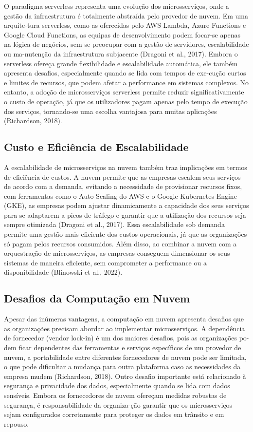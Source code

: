 O paradigma serverless representa uma evolução dos microsserviços, onde a gestão da infraestrutura é totalmente abstraída pelo provedor de nuvem. Em uma arquite-tura serverless, como as oferecidas pelo AWS Lambda, Azure Functions e Google Cloud Functions, as equipas de desenvolvimento podem focar-se apenas na lógica de negócios, sem se preocupar com a gestão de servidores, escalabilidade ou ma-nutenção da infraestrutura subjacente (Dragoni et al., 2017).
Embora o serverless ofereça grande flexibilidade e escalabilidade automática, ele também apresenta desafios, especialmente quando se lida com tempos de exe-cução curtos e limites de recursos, que podem afetar a performance em sistemas complexos. No entanto, a adoção de microsserviços serverless permite reduzir significativamente o custo de operação, já que os utilizadores pagam apenas pelo tempo de execução dos serviços, tornando-se uma escolha vantajosa para muitas aplicações (Richardson, 2018).

\subsection{Custo e Eficiência de Escalabilidade}

A escalabilidade de microsserviços na nuvem também traz implicações em termos de eficiência de custos. A nuvem permite que as empresas escalem seus serviços de acordo com a demanda, evitando a necessidade de provisionar recursos fixos, com ferramentas como o Auto Scaling do AWS e o Google Kubernetes Engine (GKE), as empresas podem ajustar dinamicamente a capacidade dos seus serviços para se adaptarem a picos de tráfego e garantir que a utilização dos recursos seja sempre otimizada (Dragoni et al., 2017).
Essa escalabilidade sob demanda permite uma gestão mais eficiente dos custos operacionais, já que as organizações só pagam pelos recursos consumidos. Além disso, ao combinar a nuvem com a orquestração de microsserviços, as empresas conseguem dimensionar os seus sistemas de maneira eficiente, sem comprometer a performance ou a disponibilidade (Blinowski et al., 2022).

\subsection{Desafios da Computação em Nuvem}

Apesar das inúmeras vantagens, a computação em nuvem apresenta desafios que as organizações precisam abordar ao implementar microsserviços. A dependência de fornecedor (vendor lock-in) é um dos maiores desafios, pois as organizações po-dem ficar dependentes das ferramentas e serviços específicos de um provedor de nuvem, a portabilidade entre diferentes fornecedores de nuvem pode ser limitada, o que pode dificultar a mudança para outra plataforma caso as necessidades da empresa mudem (Richardson, 2018).
Outro desafio importante está relacionado à segurança e privacidade dos dados, especialmente quando se lida com dados sensíveis. Embora os fornecedores de nuvem ofereçam medidas robustas de segurança, é responsabilidade da organiza-ção garantir que os microsserviços sejam configurados corretamente para proteger os dados em trânsito e em repouso.


